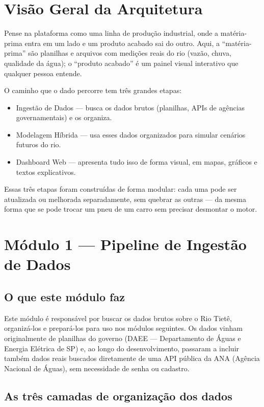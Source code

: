 \documentclass[11pt,a4paper]{article}
\begin{document}
\section{Visão Geral da Arquitetura}

Pense na plataforma como uma linha de produção industrial, onde a matéria-prima entra em um lado e um produto acabado sai do outro. Aqui, a “matéria-prima” são planilhas e arquivos com medições reais do rio (vazão, chuva, qualidade da água); o “produto acabado” é um painel visual interativo que qualquer pessoa entende.

O caminho que o dado percorre tem três grandes etapas:

\begin{itemize}
\item Ingestão de Dados — busca os dados brutos (planilhas, APIs de agências governamentais) e os organiza.
\item Modelagem Híbrida — usa esses dados organizados para simular cenários futuros do rio.
\item Dashboard Web — apresenta tudo isso de forma visual, em mapas, gráficos e textos explicativos.
\end{itemize}

Essas três etapas foram construídas de forma modular: cada uma pode ser atualizada ou melhorada separadamente, sem quebrar as outras — da mesma forma que se pode trocar um pneu de um carro sem precisar desmontar o motor.

\section{Módulo 1 — Pipeline de Ingestão de Dados}

\subsection{O que este módulo faz}

Este módulo é responsável por buscar os dados brutos sobre o Rio Tietê, organizá-los e prepará-los para uso nos módulos seguintes. Os dados vinham originalmente de planilhas do governo (DAEE — Departamento de Águas e Energia Elétrica de SP) e, ao longo do desenvolvimento, passaram a incluir também dados reais buscados diretamente de uma API pública da ANA (Agência Nacional de Águas), sem necessidade de senha ou cadastro.

\subsection{As três camadas de organização dos dados}
\end{document}
